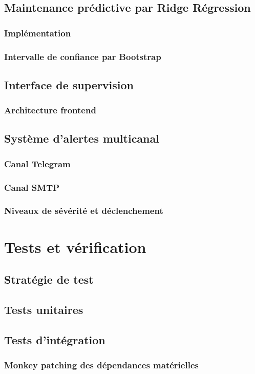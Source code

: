 \documentclass[12pt,a4paper]{report}
\begin{document}
\subsection{Maintenance prédictive par Ridge Régression}
\subsubsection{Implémentation}
\subsubsection{Intervalle de confiance par Bootstrap}
\subsection{Interface de supervision}
\subsubsection{Architecture frontend}
\subsection{Système d'alertes multicanal}
\subsubsection{Canal Telegram}
\subsubsection{Canal SMTP}
\subsubsection{Niveaux de sévérité et déclenchement}
\section{Tests et vérification}
\subsection{Stratégie de test}
\subsection{Tests unitaires}
\subsection{Tests d'intégration}
\subsubsection{Monkey patching des dépendances matérielles}
\end{document}
